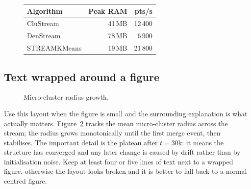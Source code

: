 \begin{figure}[H]
\centering
\begin{minipage}[t]{0.46\linewidth}
  \centering
  \vspace{0pt}
  \label{fig:mem}
\end{minipage}\hfill
\begin{minipage}[t]{0.5\linewidth}
  \vspace{0pt}
  \centering
  \label{tab:mem}
  \small
  \begin{tabular}{@{}lrr@{}}
  \toprule
  \textbf{Algorithm} & \textbf{Peak RAM} & \textbf{pts/s} \\
  \midrule
  CluStream     & 41\,MB & 12\,400 \\
  DenStream     & 78\,MB &  6\,900 \\
  STREAMKMeans  & 19\,MB & 21\,800 \\
  \bottomrule
  \end{tabular}
\end{minipage}
\end{figure}

\subsection{Text wrapped around a figure}

\begin{figure}
  \vspace{-8pt}
  \centering
  \caption{Micro-cluster radius growth.}
  \label{fig:wrap}
  \vspace{-6pt}
\end{figure}

Use this layout when the figure is small and the surrounding explanation is
what actually matters. Figure~\ref{fig:wrap} tracks the mean micro-cluster
radius across the stream; the radius grows monotonically until the first
merge event, then stabilises. The important detail is the plateau after
$t = 30$k: it means the structure has converged and any later change is
caused by drift rather than by initialisation noise. Keep at least four or
five lines of text next to a wrapped figure, otherwise the layout looks
broken and it is better to fall back to a normal centred figure.

